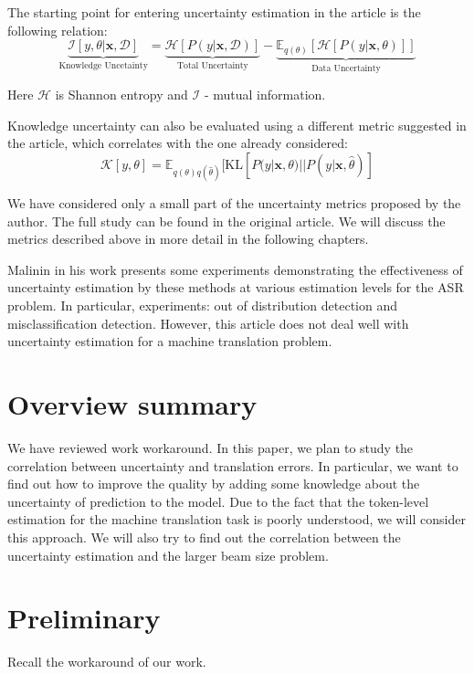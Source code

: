 \documentclass[a4paper,14pt]{extarticle}
\begin{document}
	The starting point for entering uncertainty estimation in the article is the following relation:
	\begin{equation}
		\underbrace{\mathcal{I}[y, \theta|\textbf{x}, \mathcal{D}]}_\text{Knowledge Uncetainty}
		= 
		\underbrace{\mathcal{H}[P(y | \textbf{x}, \mathcal{D})]}_\text{Total Uncertainty}
		-
		\underbrace{\mathbb{E}_{q(\theta)}[\mathcal{H}[P(y| \textbf{x}, \theta)]]}_\text{Data Uncertainty}
	\end{equation}
	
	Here $\mathcal{H}$ is Shannon entropy and $\mathcal{I}$ - mutual information.
	
	Knowledge uncertainty can also be evaluated using a different metric suggested in the article, which correlates with the one already considered:
	\begin{equation}
		\mathcal{K}[y, \theta] = \mathbb{E}_{q(\theta)q(\hat{\theta})}[
			\mathrm{KL}[P(y|\textbf{x}, \theta) || P(y|\textbf{x}, \hat{\theta})
		]
	\end{equation}
	
	We have considered only a small part of the uncertainty metrics proposed by the author. The full study can be found in the original article. We will discuss the metrics described above in more detail in the following chapters.

	Malinin in his work presents some experiments demonstrating the effectiveness of uncertainty estimation by these methods at various estimation levels for the ASR problem. In particular, experiments: out of distribution detection and misclassification detection. However, this article does not deal well with uncertainty estimation for a machine translation problem.
	\section{Overview summary}
	We have reviewed work workaround. In this paper, we plan to study the correlation between uncertainty and translation errors. In particular, we want to find out how to improve the quality by adding some knowledge about the uncertainty of prediction to the model. Due to the fact that the token-level estimation for the machine translation task is poorly understood, we will consider this approach. We will also try to find out the correlation between the uncertainty estimation and the larger beam size problem.
	

\section{Preliminary}
	Recall the workaround of our work.
\end{document}
